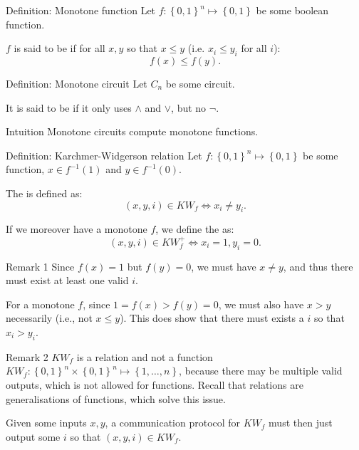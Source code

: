 \documentclass[a4paper]{article}
\begin{document}
\begin{parag}{Definition: Monotone function}
    Let $f: \left\{0, 1\right\}^n \mapsto \left\{0, 1\right\}$ be some boolean function.

    $f$ is said to be  if for all $x, y$ so that $x \leq y$ (i.e. $x_i \leq y_i$ for all $i$): 
    \[f\left(x\right) \leq f\left(y\right).\]
\end{parag}

\begin{parag}{Definition: Monotone circuit}
    Let $C_n$ be some circuit.

    It is said to be  if it only uses $\land$ and $\lor$, but no $\lnot$.

    \begin{subparag}{Intuition}
        Monotone circuits compute monotone functions.
    \end{subparag}
\end{parag}

\begin{parag}{Definition: Karchmer-Widgerson relation}
    Let $f: \left\{0, 1\right\}^n \mapsto \left\{0, 1\right\}$ be some function, $x \in f^{-1}\left(1\right)$ and $y \in f^{-1}\left(0\right)$.

    The  is defined as: 
    \[\left(x, y, i\right) \in KW_f \iff x_i \neq y_i.\]

    If we moreover have a monotone $f$, we define the  as: 
    \[\left(x, y, i\right) \in KW_f^+ \iff x_i = 1, y_i = 0.\]

    \begin{subparag}{Remark 1}
        Since $f\left(x\right) = 1$ but $f\left(y\right) = 0$, we must have $x \neq y$, and thus there must exist at least one valid $i$.

        For a monotone $f$, since $1 = f\left(x\right) > f\left(y\right) = 0$, we must also have $x > y$ necessarily (i.e., not $x \leq y$). This does show that there must exists a $i$ so that $x_i > y_i$.
    \end{subparag}

    \begin{subparag}{Remark 2}
        $KW_f$ is a relation and not a function $KW_f: \left\{0, 1\right\}^n \times \left\{0, 1\right\}^n \mapsto \left\{1, \ldots, n\right\}$, because there may be multiple valid outputs, which is not allowed for functions. Recall that relations are generalisations of functions, which solve this issue.

        Given some inputs $x, y$, a communication protocol for $KW_f$ must then just output some $i$ so that $\left(x, y, i\right) \in KW_f$. 
    \end{subparag}
\end{parag}
\end{document}
